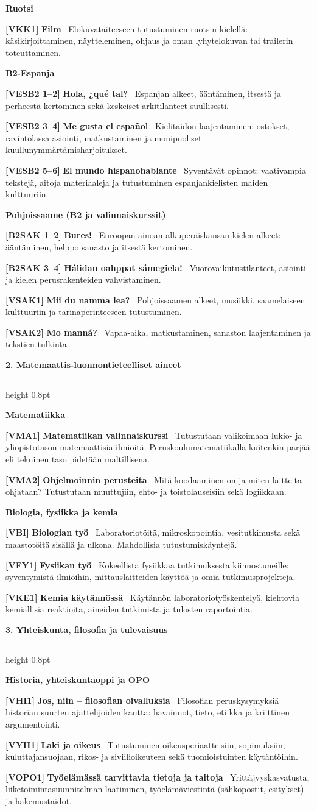 \documentclass[10pt,a4paper]{article}
\newcommand{\mysection}[1]{%
  \vspace{6pt}%
  {\noindent\large\bfseries\color{brandblue} #1}\par
  \vspace{1pt}%
  {\color{brandblue}\hrule height 0.8pt}%
  \vspace{3pt}%
}
\newcommand{\mysubsection}[1]{%
  \vspace{3pt}%
  {\noindent\normalsize\bfseries\color{accentteal} #1}\par
  \vspace{1pt}%
}
\newcommand{\courseitem}[3]{%
  \noindent\textbf{\color{badgecode}[#1]} \textbf{#2} \textendash\ {\color{textdark}#3}\par\vspace{1.5pt}%
}
\begin{document}
\mysubsection{Ruotsi}
\courseitem{VKK1}{Film}{Elokuvataiteeseen tutustuminen ruotsin kielellä: käsikirjoittaminen, näytteleminen, ohjaus ja oman lyhytelokuvan tai trailerin toteuttaminen.}

\mysubsection{B2-Espanja}
\courseitem{VESB2 1--2}{Hola, ¿qué tal?}{Espanjan alkeet, ääntäminen, itsestä ja perheestä kertominen sekä keskeiset arkitilanteet suullisesti.}
\courseitem{VESB2 3--4}{Me gusta el español}{Kielitaidon laajentaminen: ostokset, ravintolassa asiointi, matkustaminen ja monipuoliset kuullunymmärtämisharjoitukset.}
\courseitem{VESB2 5--6}{El mundo hispanohablante}{Syventävät opinnot: vaativampia tekstejä, aitoja materiaaleja ja tutustuminen espanjankielisten maiden kulttuuriin.}

\mysubsection{Pohjoissaame (B2 ja valinnaiskurssit)}
\courseitem{B2SAK 1--2}{Bures!}{Euroopan ainoan alkuperäiskansan kielen alkeet: ääntäminen, helppo sanasto ja itsestä kertominen.}
\courseitem{B2SAK 3--4}{Hálidan oahppat sámegiela!}{Vuorovaikutustilanteet, asiointi ja kielen perusrakenteiden vahvistaminen.}
\courseitem{VSAK1}{Mii du namma lea?}{Pohjoissaamen alkeet, musiikki, saamelaiseen kulttuuriin ja tarinaperinteeseen tutustuminen.}
\courseitem{VSAK2}{Mo manná?}{Vapaa-aika, matkustaminen, sanaston laajentaminen ja tekstien tulkinta.}

\mysection{2. Matemaattis-luonnontieteelliset aineet}

\mysubsection{Matematiikka}
\courseitem{VMA1}{Matematiikan valinnaiskurssi}{Tutustutaan valikoimaan lukio- ja yliopistotason matemaattisia ilmiöitä. Peruskoulumatematiikalla kuitenkin pärjää eli tekninen taso pidetään maltillisena.}
\courseitem{VMA2}{Ohjelmoinnin perusteita}{Mitä koodaaminen on ja miten laitteita ohjataan? Tutustutaan muuttujiin, ehto- ja toistolauseisiin sekä logiikkaan.}

\mysubsection{Biologia, fysiikka ja kemia}
\courseitem{VBI}{Biologian työ}{Laboratoriotöitä, mikroskopointia, vesitutkimusta sekä maastotöitä sisällä ja ulkona. Mahdollisia tutustumiskäyntejä.}
\courseitem{VFY1}{Fysiikan työ}{Kokeellista fysiikkaa tutkimuksesta kiinnostuneille: syventymistä ilmiöihin, mittauslaitteiden käyttöä ja omia tutkimusprojekteja.}
\courseitem{VKE1}{Kemia käytännössä}{Käytännön laboratoriotyöskentelyä, kiehtovia kemiallisia reaktioita, aineiden tutkimista ja tulosten raportointia.}

\mysection{3. Yhteiskunta, filosofia ja tulevaisuus}

\mysubsection{Historia, yhteiskuntaoppi ja OPO}
\courseitem{VHI1}{Jos, niin -- filosofian oivalluksia}{Filosofian peruskysymyksiä historian suurten ajattelijoiden kautta: havainnot, tieto, etiikka ja kriittinen argumentointi.}
\courseitem{VYH1}{Laki ja oikeus}{Tutustuminen oikeusperiaatteisiin, sopimuksiin, kuluttajansuojaan, rikos- ja siviilioikeuteen sekä tuomioistuinten käytäntöihin.}
\courseitem{VOPO1}{Työelämässä tarvittavia tietoja ja taitoja}{Yrittäjyyskasvatusta, liiketoimintasuunnitelman laatiminen, työelämäviestintä (sähköpostit, esitykset) ja hakemustaidot.}
\end{document}
